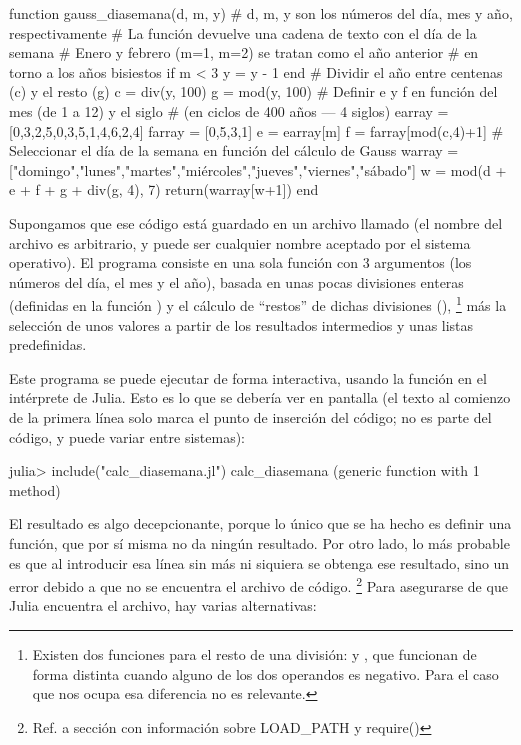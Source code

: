 \begin{juliacode}
function gauss_diasemana(d, m, y)
# d, m, y son los números del día, mes y año, respectivamente
# La función devuelve una cadena de texto con el día de la semana
  # Enero y febrero (m=1, m=2) se tratan como el año anterior
  # en torno a los años bisiestos
  if m < 3
    y = y - 1
  end
  # Dividir el año entre centenas (c) y el resto (g)
  c = div(y, 100)
  g = mod(y, 100)
  # Definir e y f en función del mes (de 1 a 12) y el siglo
  # (en ciclos de 400 años --- 4 siglos)
  earray = [0,3,2,5,0,3,5,1,4,6,2,4]
  farray = [0,5,3,1]
  e = earray[m]
  f = farray[mod(c,4)+1]
  # Seleccionar el día de la semana en función del cálculo de Gauss
  warray = ["domingo","lunes","martes","miércoles","jueves","viernes","sábado"]
  w = mod(d + e + f + g + div(g, 4), 7)
  return(warray[w+1])
end
\end{juliacode}

Supongamos que ese código está guardado en un archivo llamado  (el nombre del archivo es arbitrario, y puede ser cualquier nombre aceptado por el sistema operativo). El programa consiste en una sola función con 3 argumentos (los números del día, el mes y el año), basada en unas pocas divisiones enteras (definidas en la función ) y el cálculo de ``restos'' de dichas divisiones (),%
\footnote{%
Existen dos funciones para el resto de una división:  y , que funcionan de forma distinta cuando alguno de los dos operandos es negativo. Para el caso que nos ocupa esa diferencia no es relevante.%
}
más la selección de unos valores a partir de los resultados intermedios y unas listas predefinidas.

Este programa se puede ejecutar de forma interactiva, usando la función  en el intérprete de Julia. Esto es lo que se debería ver en pantalla (el texto  al comienzo de la primera línea solo marca el punto de inserción del código; no es parte del código, y puede variar entre sistemas):

\begin{jlconcode}
julia> include("calc_diasemana.jl")
calc_diasemana (generic function with 1 method)
\end{jlconcode}

El resultado es algo decepcionante, porque lo único que se ha hecho es definir una función, que por sí misma no da ningún resultado. Por otro lado, lo más probable es que al introducir esa línea sin más ni siquiera se obtenga ese resultado, sino un error debido a que no se encuentra el archivo de código.%
\footnote{%
Ref. a sección con información sobre LOAD\_PATH y require()%
}
Para asegurarse de que Julia encuentra el archivo,
hay varias alternativas:

